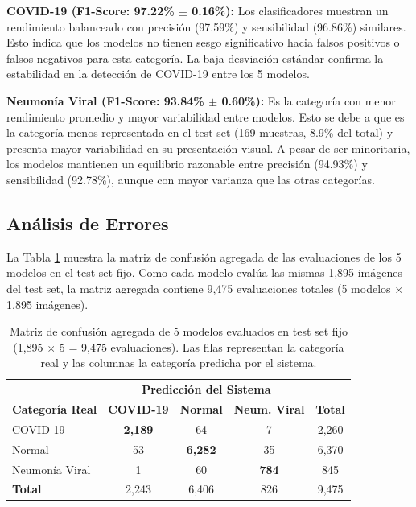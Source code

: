 \textbf{COVID-19 (F1-Score: 97.22\% $\pm$ 0.16\%):} Los clasificadores muestran un rendimiento balanceado con precisión (97.59\%) y sensibilidad (96.86\%) similares. Esto indica que los modelos no tienen sesgo significativo hacia falsos positivos o falsos negativos para esta categoría. La baja desviación estándar confirma la estabilidad en la detección de COVID-19 entre los 5 modelos.

\textbf{Neumonía Viral (F1-Score: 93.84\% $\pm$ 0.60\%):} Es la categoría con menor rendimiento promedio y mayor variabilidad entre modelos. Esto se debe a que es la categoría menos representada en el test set (169 muestras, 8.9\% del total) y presenta mayor variabilidad en su presentación visual. A pesar de ser minoritaria, los modelos mantienen un equilibrio razonable entre precisión (94.93\%) y sensibilidad (92.78\%), aunque con mayor varianza que las otras categorías.

\subsection{Análisis de Errores}
\label{subsec:matriz_confusion}

La Tabla \ref{tab:matriz_confusion} muestra la matriz de confusión agregada de las evaluaciones de los 5 modelos en el test set fijo. Como cada modelo evalúa las mismas 1,895 imágenes del test set, la matriz agregada contiene 9,475 evaluaciones totales (5 modelos $\times$ 1,895 imágenes).

\begin{table}[htbp]
    \centering
    \caption{Matriz de confusión agregada de 5 modelos evaluados en test set fijo (1,895 $\times$ 5 = 9,475 evaluaciones). Las filas representan la categoría real y las columnas la categoría predicha por el sistema.}
    \label{tab:matriz_confusion}
    \small
    \begin{tabular}{@{}lccc|c@{}}
        \toprule
        & \multicolumn{3}{c}{\textbf{Predicción del Sistema}} & \\
        \textbf{Categoría Real} & \textbf{COVID-19} & \textbf{Normal} & \textbf{Neum. Viral} & \textbf{Total} \\
        \midrule
        COVID-19 & \textbf{2,189} & 64 & 7 & 2,260 \\
        Normal & 53 & \textbf{6,282} & 35 & 6,370 \\
        Neumonía Viral & 1 & 60 & \textbf{784} & 845 \\
        \midrule
        \textbf{Total} & 2,243 & 6,406 & 826 & 9,475 \\
        \bottomrule
    \end{tabular}
\end{table}

